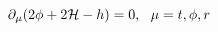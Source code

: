 \begin{equation}
\partial_\mu (2 \phi +2 {\cal H} - h ) =0, ~~\mu=t,\phi,r
\label{eq_anti_simple}
\end{equation}

